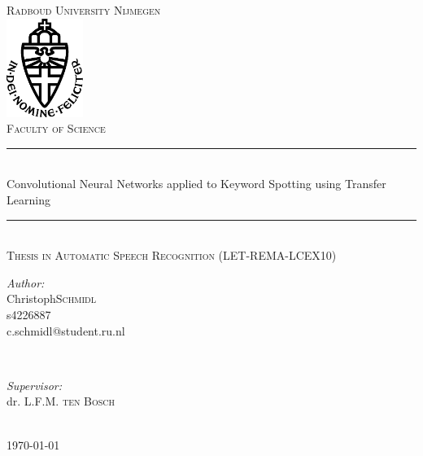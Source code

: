 \documentclass{article}
\title{\thesistitle}
\author{\thesisauthorfirst\space\thesisauthorsecond}
\date{\thesisdate}
\makeatletter
\def\thesistitle{Convolutional Neural Networks applied to Keyword Spotting using Transfer Learning}
\def\thesissubtitle{Why Transfer learning is worth a try}
\def\thesisauthorfirst{Christoph}
\def\thesisauthorsecond{Schmidl}
\def\thesisauthorstudentnumber{s4226887}
\def\thesisauthoremail{c.schmidl@student.ru.nl}
\def\thesissupervisorfirst{dr. L.F.M. }
\def\thesissupervisorsecond{ten Bosch}
\def\thesissecondreaderfirst{prof. dr. Louie}
\def\thesissecondreadersecond{Duck}
\def\thesisdate{\today}
\theoremstyle{definition}
\theoremstyle{remark}
\makeatother
\begin{document}
\begin{titlepage}
	\thispagestyle{empty}
	\newcommand{\HRule}{\rule{\linewidth}{0.5mm}}
	\center
	\textsc{\Large Radboud University Nijmegen}\\[.7cm]
	\includegraphics[width=25mm]{img/in_dei_nomine_feliciter.eps}\\[.5cm]
	\textsc{Faculty of Science}\\[0.5cm]
	
	\HRule \\[0.4cm]
	{ \huge  \thesistitle}\\[0.1cm]
	\HRule \\[.5cm]
	

	\textsc{\large Thesis in Automatic Speech Recognition (LET-REMA-LCEX10)}\\[.5cm]

	\begin{minipage}[t]{0.4\textwidth}
	\begin{flushleft} \large
	\emph{Author:}\\
	\vspace{1em}
	\thesisauthorfirst\space \textsc{\thesisauthorsecond}\\
	\thesisauthorstudentnumber\\
	\thesisauthoremail\space 
	\end{flushleft}
	\end{minipage}
	~
	\begin{minipage}[t]{0.4\textwidth}
	\begin{flushright} \large
	\emph{Supervisor:} \\
	\vspace{1em}
	\thesissupervisorfirst\space \textsc{\thesissupervisorsecond} \\[1em]
	\end{flushright}
	\end{minipage}\\[4cm]
	\vfill
	{\large \thesisdate}\\
	\clearpage
\end{titlepage}
\end{document}
